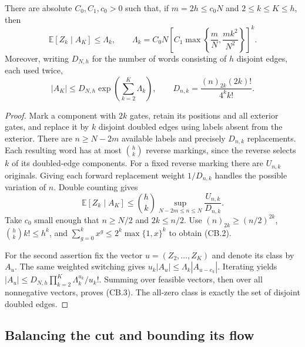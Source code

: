 \begin{lemma}
\label{lem:component-switching}
There are absolute $C_0,C_1,c_0>0$ such that, if $m=2h\le c_0N$ and
$2\le k\le K\le h$, then
\[
 \mathbb E[Z_k\mid A_K]\le\Lambda_k,
 \qquad
 \Lambda_k=C_0N\left[C_1\max\left\{\frac mN,
                                      \frac{mk^2}{N^2}\right\}\right]^k.
                                                        \tag{CB.2}
\]
Moreover, writing $D_{N,h}$ for the number of words consisting of $h$
disjoint edges, each used twice,
\[
 |A_K|\le D_{N,h}\exp\left(\sum_{k=2}^K\Lambda_k\right),\qquad
 D_{n,k}=\frac{(n)_{2k}(2k)!}{4^k k!}.                  \tag{CB.3}
\]
\end{lemma}
\begin{proof}
Mark a component with $2k$ gates, retain its positions and all exterior
gates, and replace it by $k$ disjoint doubled edges using labels absent
from the exterior.  There are $n\ge N-2m$ available labels and precisely
$D_{n,k}$ replacements.  Each resulting word has at most $\binom hk$
reverse markings, since the reverse selects $k$ of its doubled-edge
components.  For a fixed reverse marking there are $U_{n,k}$ originals.
Giving each forward replacement weight $1/D_{n,k}$ handles the possible
variation of $n$.  Double counting gives
\[
 \mathbb E[Z_k\mid A_K]\le\binom hk
                  \sup_{N-2m\le n\le N}\frac{U_{n,k}}{D_{n,k}}.
\]
Take $c_0$ small enough that $n\ge N/2$ and $2k\le n/2$.
Use $(n)_{2k}\ge(n/2)^{2k}$,
$\binom hk k!\le h^k$, and
$\sum_{g=0}^k x^g\le2^k\max\{1,x\}^k$ to obtain (CB.2).

For the second assertion fix the vector $u=(Z_2,\ldots,Z_K)$ and denote
its class by $A_u$.  The same weighted switching gives
$u_k|A_u|\le\Lambda_k|A_{u-e_k}|$.  Iterating yields
$|A_u|\le D_{N,h}\prod_{k=2}^K\Lambda_k^{u_k}/u_k!$.
Summing over feasible vectors, then over all nonnegative vectors, proves
(CB.3).  The all-zero class is exactly the set of disjoint doubled edges.
\end{proof}

\subsection{Balancing the cut and bounding its flow}

